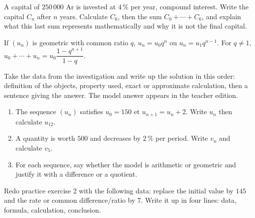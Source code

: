 \begin{activite}
A capital of $250\,000$ Ar is invested at $4\,\%$ per year, compound interest. Write the capital $C_n$ after $n$ years. Calculate $C_6$, then the sum $C_0+\cdots+C_6$, and explain what this last sum represents mathematically and why it is not the final capital.

\end{activite}

\begin{traceecrite}If $(u_n)$ is geometric with common ratio $q$, $u_n=u_0q^n$ ou $u_n=u_1q^{n-1}$. For $q\neq1$, $u_0+\cdots+u_n=u_0\dfrac{1-q^{n+1}}{1-q}$.\end{traceecrite}

\begin{exemple}
Take the data from the investigation and write up the solution in this order: definition of the objects, property used, exact or approximate calculation, then a sentence giving the answer. The model answer appears in the teacher edition.
\end{exemple}

\begin{exercice}[-- essential]
\begin{enumerate}\item The sequence $(u_n)$ satisfies $u_0=150$ et $u_{n+1}=u_n+2$. Write $u_n$ then calculate $u_{12}$.\item A quantity is worth $500$ and decreases by $2\,\%$ per period. Write $v_n$ and calculate $v_5$.\item For each sequence, say whether the model is arithmetic or geometric and justify it with a difference or a quotient.\end{enumerate}
\end{exercice}


\begin{dm}Redo practice exercise 2 with the following data: replace the initial value by $145$ and the rate or common difference/ratio by $7$. Write it up in four lines: data, formula, calculation, conclusion.\end{dm}

